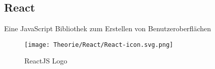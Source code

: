 \subsection{React}
\label{reactjs}
Eine JavaScript Bibliothek zum Erstellen von Benutzeroberflächen

\begin{figure}[H]
  \begin{center}
    \texttt{[image: Theorie/React/React-icon.svg.png]}
    \caption{ReactJS Logo \cite{reactjs}}
  \end{center}
\end{figure}
